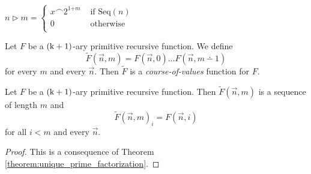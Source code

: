 \documentclass[10pt]{amsart}
\newcommand{\mle}{\boldsymbol{<}}
\newcommand{\meq}{\boldsymbol{=}}
\newcommand{\mplus}{\boldsymbol{+}}
\begin{document}
\begin{definition}
	$n \triangleright m \meq \begin{cases}
			x \frown 2^{1 \mplus m} & \mbox{ if }\mathrm{Seq}(n) \\
			0                  & \mbox{ otherwise }         \\
		\end{cases}$
\end{definition}

\begin{definition}
	Let $F$ be a $\rm{(k + 1)}$-ary primitive recursive function. We define
  $$\tilde{F}(\vec{n},m) \meq F(\vec{n},0)...F(\vec{n},m \dotminus 1)$$
  for every $m$ and every $\vec{n}$. Then $\tilde{F}$ is a \textit{course-of-values} function for $F$.
\end{definition}

\begin{fact}\label{fact:course_of_values_function}
	Let $F$ be a $\rm{(k + 1)}$-ary primitive recursive function. Then $\tilde{F}(\vec{n},m)$ is a sequence of length $m$ and
	$$\tilde{F}(\vec{n},m)_i \meq F(\vec{n},i)$$
	for all $i \mle m$ and every $\vec{n}$. 
\end{fact}
\begin{proof}
  This is a consequence of Theorem \ref{theorem:unique_prime_factorization}.
\end{proof}
\end{document}
